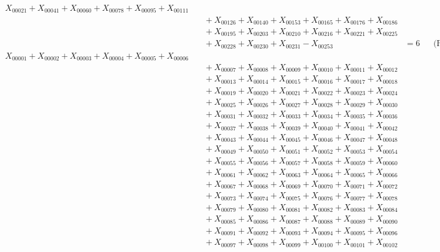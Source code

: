 \documentclass[a4paper,10pt]{article}
\begin{document}
{\begin{align}
X_{00021} + X_{00041} + X_{00060} + X_{00078} + X_{00095} + X_{00111} \\[0.5ex]
&\quad  + X_{00126} + X_{00140} + X_{00153} + X_{00165} + X_{00176} + X_{00186} \\[0.5ex]
&\quad  + X_{00195} + X_{00203} + X_{00210} + X_{00216} + X_{00221} + X_{00225} \\[0.5ex]
&\quad  + X_{00228} + X_{00230} + X_{00231} - X_{00253} &= 6 && \text{(R00022)} \\
X_{00001} + X_{00002} + X_{00003} + X_{00004} + X_{00005} + X_{00006} \\[0.5ex]
&\quad  + X_{00007} + X_{00008} + X_{00009} + X_{00010} + X_{00011} + X_{00012} \\[0.5ex]
&\quad  + X_{00013} + X_{00014} + X_{00015} + X_{00016} + X_{00017} + X_{00018} \\[0.5ex]
&\quad  + X_{00019} + X_{00020} + X_{00021} + X_{00022} + X_{00023} + X_{00024} \\[0.5ex]
&\quad  + X_{00025} + X_{00026} + X_{00027} + X_{00028} + X_{00029} + X_{00030} \\[0.5ex]
&\quad  + X_{00031} + X_{00032} + X_{00033} + X_{00034} + X_{00035} + X_{00036} \\[0.5ex]
&\quad  + X_{00037} + X_{00038} + X_{00039} + X_{00040} + X_{00041} + X_{00042} \\[0.5ex]
&\quad  + X_{00043} + X_{00044} + X_{00045} + X_{00046} + X_{00047} + X_{00048} \\[0.5ex]
&\quad  + X_{00049} + X_{00050} + X_{00051} + X_{00052} + X_{00053} + X_{00054} \\[0.5ex]
&\quad  + X_{00055} + X_{00056} + X_{00057} + X_{00058} + X_{00059} + X_{00060} \\[0.5ex]
&\quad  + X_{00061} + X_{00062} + X_{00063} + X_{00064} + X_{00065} + X_{00066} \\[0.5ex]
&\quad  + X_{00067} + X_{00068} + X_{00069} + X_{00070} + X_{00071} + X_{00072} \\[0.5ex]
&\quad  + X_{00073} + X_{00074} + X_{00075} + X_{00076} + X_{00077} + X_{00078} \\[0.5ex]
&\quad  + X_{00079} + X_{00080} + X_{00081} + X_{00082} + X_{00083} + X_{00084} \\[0.5ex]
&\quad  + X_{00085} + X_{00086} + X_{00087} + X_{00088} + X_{00089} + X_{00090} \\[0.5ex]
&\quad  + X_{00091} + X_{00092} + X_{00093} + X_{00094} + X_{00095} + X_{00096} \\[0.5ex]
&\quad  + X_{00097} + X_{00098} + X_{00099} + X_{00100} + X_{00101} + X_{00102} \\[0.5ex]

\end{align}}
\end{document}
